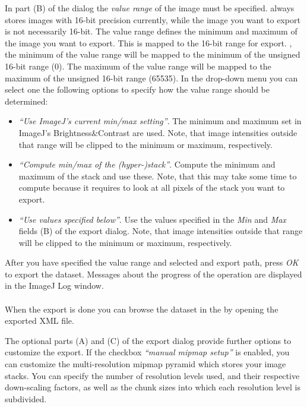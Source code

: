 \documentclass{scrartcl}
\begin{document}
In part (B) of the dialog the \emph{value range} of the image must be specified.
\Bdv always stores images with 16-bit precision currently, while the image you want to export is not necessarily 16-bit.
The value range defines the minimum and maximum of the image you want to export.
This is mapped to the 16-bit range for export.
\Ie, the minimum of the value range will be mapped to the minimum of the unsigned 16-bit range (0).
The maximum of the value range will be mapped to the maximum of the unsigned 16-bit range (65535).
In the drop-down menu you can select one the following options to specify how the value range should be determined:
\begin{itemize}
  \item \emph{``Use ImageJ's current min/max setting''}. The minimum and maximum set in ImageJ's Brightness\&Contrast are used. Note, that image intensities outside that range will be clipped to the minimum or maximum, respectively.
  \item \emph{``Compute min/max of the (hyper-)stack''}. Compute the minimum and maximum of the stack and use these. Note, that this may take some time to compute because it requires to look at all pixels of the stack you want to export.
  \item \emph{``Use values specified below''}. Use the values specified in the \emph{Min} and \emph{Max} fields (B) of the export dialog. Note, that image intensities outside that range will be clipped to the minimum or maximum, respectively.
\end{itemize}

After you have specified the value range and selected and export path, press \emph{OK} to export the dataset.
Messages about the progress of the operation are displayed in the ImageJ Log window.
\\
\\
When the export is done you can browse the dataset in the \bdv by opening the exported XML file.

The optional parts (A) and (C) of the export dialog provide further options to customize the export.
If the checkbox \emph{``manual mipmap setup''} is enabled, you can customize the multi-resolution mipmap pyramid which stores your image stacks.
You can specify the number of resolution levels used, and their respective down-scaling factors, as well as the chunk sizes into which each resolution level is subdivided.
\end{document}
